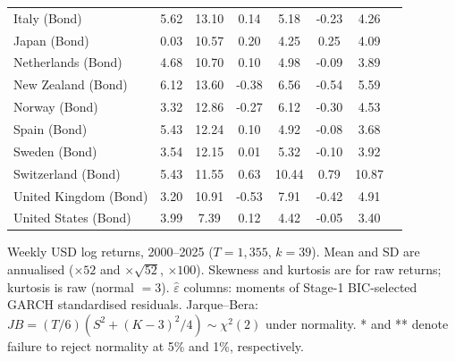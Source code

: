 \begin{table}[H]
\begin{threeparttable}
\begin{tabular}{lSSSSSSS}
\hspace{1em}Italy (Bond) & 5.62 & 13.10 & 0.14 & 5.18 & -0.23 & 4.26 \\
\hspace{1em}Japan (Bond) & 0.03 & 10.57 & 0.20 & 4.25 & 0.25 & 4.09 \\
\hspace{1em}Netherlands (Bond) & 4.68 & 10.70 & 0.10 & 4.98 & -0.09 & 3.89 \\
\hspace{1em}New Zealand (Bond) & 6.12 & 13.60 & -0.38 & 6.56 & -0.54 & 5.59 \\
\hspace{1em}Norway (Bond) & 3.32 & 12.86 & -0.27 & 6.12 & -0.30 & 4.53 \\
\hspace{1em}Spain (Bond) & 5.43 & 12.24 & 0.10 & 4.92 & -0.08 & 3.68 \\
\hspace{1em}Sweden (Bond) & 3.54 & 12.15 & 0.01 & 5.32 & -0.10 & 3.92 \\
\hspace{1em}Switzerland (Bond) & 5.43 & 11.55 & 0.63 & 10.44 & 0.79 & 10.87 \\
\hspace{1em}United Kingdom (Bond) & 3.20 & 10.91 & -0.53 & 7.91 & -0.42 & 4.91 \\
\hspace{1em}United States (Bond) & 3.99 & 7.39 & 0.12 & 4.42 & -0.05 & 3.40 \\
\bottomrule
\end{tabular}
\begin{tablenotes}[flushleft]
\small
\item Weekly USD log returns, 2000--2025 ($T=1{,}355$, $k=39$). Mean and SD are annualised ($\times 52$ and $\times\sqrt{52}$, $\times 100$). Skewness and kurtosis are for raw returns; kurtosis is raw (normal $=3$). $\hat{\varepsilon}$ columns: moments of Stage-1 BIC-selected GARCH standardised residuals. Jarque--Bera: $JB=(T/6)(S^2+(K-3)^2/4)\sim\chi^2(2)$ under normality. * and ** denote failure to reject normality at 5\% and 1\%, respectively.
\end{tablenotes}
\end{threeparttable}
\end{table}
